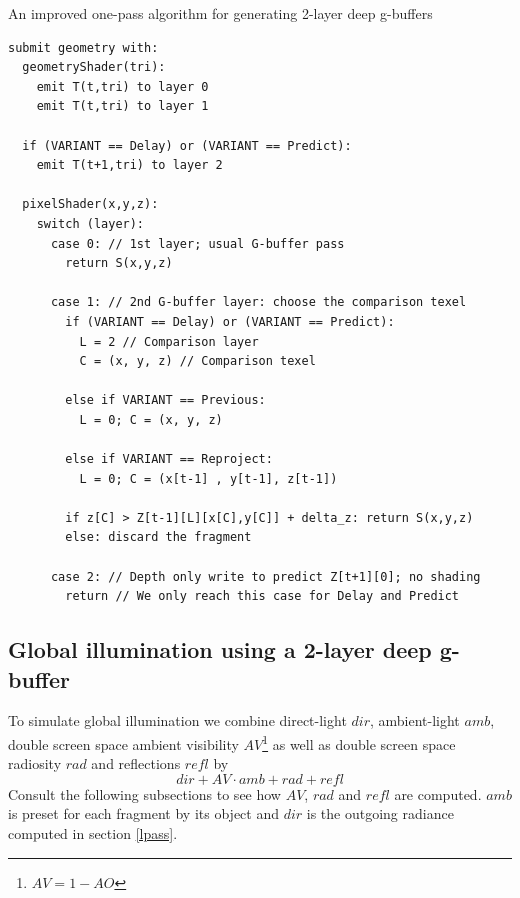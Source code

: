 \documentclass{ACGSeminar}
\begin{document}
		\begin{algorithm} \label{one_pass_strawman} \caption{An improved one-pass algorithm for generating 2-layer deep g-buffers}
		\begin{lstlisting}[frame=single]
submit geometry with:
  geometryShader(tri):
    emit T(t,tri) to layer 0
    emit T(t,tri) to layer 1

  if (VARIANT == Delay) or (VARIANT == Predict):
    emit T(t+1,tri) to layer 2

  pixelShader(x,y,z):
    switch (layer):
      case 0: // 1st layer; usual G-buffer pass
        return S(x,y,z)

      case 1: // 2nd G-buffer layer: choose the comparison texel
        if (VARIANT == Delay) or (VARIANT == Predict):
          L = 2 // Comparison layer
          C = (x, y, z) // Comparison texel

        else if VARIANT == Previous:
          L = 0; C = (x, y, z)

        else if VARIANT == Reproject:
          L = 0; C = (x[t-1] , y[t-1], z[t-1])

        if z[C] > Z[t-1][L][x[C],y[C]] + delta_z: return S(x,y,z)
        else: discard the fragment

      case 2: // Depth only write to predict Z[t+1][0]; no shading
        return // We only reach this case for Delay and Predict
		\end{lstlisting}
		\end{algorithm}
	\subsection{Global illumination using a 2-layer deep g-buffer} \label{gi}
		To simulate global illumination we combine direct-light $dir$, ambient-light $amb$, double screen space ambient visibility $AV$\footnote{$AV = 1-AO$} as well as double screen space radiosity $rad$ and reflections $refl$ by \cite{RSM} \cite{TSTMT}
		$$ dir + AV \cdot amb + rad + refl $$
		Consult the following subsections to see how $AV$, $rad$ and $refl$ are computed. $amb$ is preset for each fragment by its object and $dir$ is the outgoing radiance computed in section \ref{lpass}.%
\end{document}
